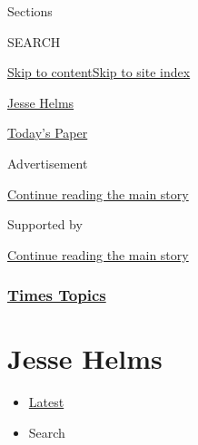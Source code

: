 Sections

SEARCH

\protect\hyperlink{site-content}{Skip to
content}\protect\hyperlink{site-index}{Skip to site index}

\href{https://www.nytimes.com/topic/person/jesse-helms}{Jesse Helms}

\href{https://myaccount.nytimes.com/auth/login?response_type=cookie\&client_id=vi}{}

\href{https://www.nytimes.com/section/todayspaper}{Today's Paper}

Advertisement

\protect\hyperlink{after-top}{Continue reading the main story}

Supported by

\protect\hyperlink{after-sponsor}{Continue reading the main story}

\hypertarget{times-topics}{%
\subsubsection{\texorpdfstring{\href{/index.html}{Times
Topics}}{Times Topics}}\label{times-topics}}

\hypertarget{jesse-helms}{%
\section{Jesse Helms}\label{jesse-helms}}

\begin{itemize}
\tightlist
\item
  \protect\hyperlink{stream-panel}{Latest}
\item
  Search
\end{itemize}

